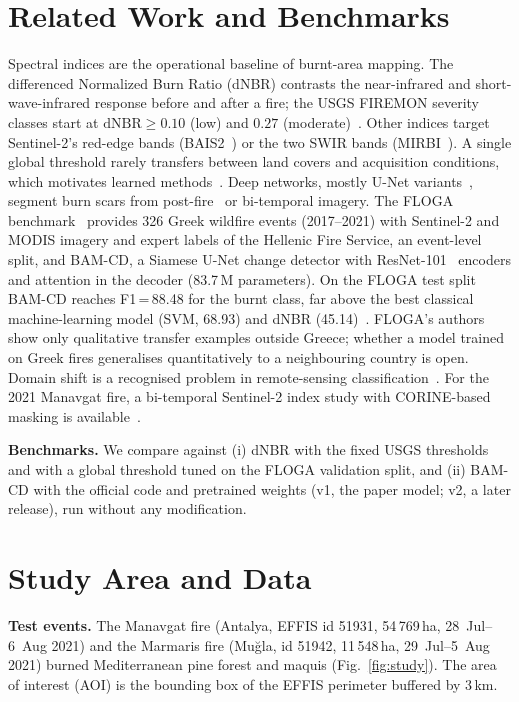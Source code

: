 \section{Related Work and Benchmarks}\label{sec:related}
Spectral indices are the operational baseline of burnt-area mapping. The differenced Normalized Burn Ratio
(dNBR) contrasts the near-infrared and short-wave-infrared response before and after a fire; the USGS FIREMON
severity classes start at $\mathrm{dNBR}\geq0.10$ (low) and $0.27$ (moderate)~\cite{key2006landscape}. Other
indices target Sentinel-2's red-edge bands (BAIS2~\cite{filipponi2018bais2}) or the two SWIR bands
(MIRBI~\cite{trigg2001mirbi}). A single global threshold rarely transfers between land covers and acquisition
conditions, which motivates learned methods~\cite{sdraka2024floga,roy2019landsat}.
Deep networks, mostly U-Net variants~\cite{ronneberger2015unet}, segment burn scars from post-fire~\cite{knopp2020deep}
or bi-temporal imagery. The FLOGA benchmark~\cite{sdraka2024floga} provides 326 Greek wildfire events (2017--2021)
with Sentinel-2 and MODIS imagery and expert labels of the Hellenic Fire Service, an event-level split, and
BAM-CD, a Siamese U-Net change detector with ResNet-101~\cite{he2016resnet} encoders and attention in the decoder
(83.7\,M parameters). On the FLOGA test split BAM-CD reaches F1\,=\,88.48 for the burnt class, far above the best
classical machine-learning model (SVM, 68.93) and dNBR (45.14)~\cite{sdraka2024floga}. FLOGA's authors show only
qualitative transfer examples outside Greece; whether a model trained on Greek fires generalises quantitatively to a
neighbouring country is open. Domain shift is a recognised problem in remote-sensing classification~\cite{tuia2016domain}.
For the 2021 Manavgat fire, a bi-temporal Sentinel-2 index study with CORINE-based masking is available~\cite{altay2026manavgat}.

\textbf{Benchmarks.} We compare against (i) dNBR with the fixed USGS thresholds and with a global threshold tuned on
the FLOGA validation split, and (ii) BAM-CD with the official code and pretrained weights (v1, the paper model;
v2, a later release), run without any modification.

\section{Study Area and Data}\label{sec:data}
\textbf{Test events.} The Manavgat fire (Antalya, EFFIS id 51931, 54\,769\,ha, 28~Jul--6~Aug 2021) and the
Marmaris fire (Mu\u{g}la, id 51942, 11\,548\,ha, 29~Jul--5~Aug 2021) burned Mediterranean pine forest and maquis
(Fig.~\ref{fig:study}). The area of interest (AOI) is the bounding box of the EFFIS perimeter buffered by 3\,km.

